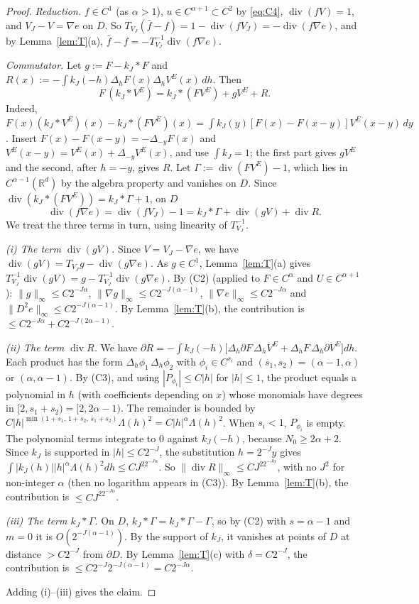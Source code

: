 \documentclass[11pt]{article}
\theoremstyle{definition}
\theoremstyle{remark}
\newcommand{\R}{\mathbb R}
\newcommand{\dv}{\operatorname{div}}
\begin{document}
\begin{proof}
\emph{Reduction.} $f\in C^1$ (as $\alpha>1$), $u\in C^{\alpha+1}\subset C^2$ by \eqref{eq:C4}, $\dv(fV)=1$, and $V_J-V=\nabla e$ on $D$. So
$T_{V_J}(\bar f-f)=1-\dv(fV_J)=-\dv(f\nabla e)$, and by Lemma~\ref{lem:T}(a), $\bar f-f=-T^{-1}_{V_J}\dv(f\nabla e)$.

\emph{Commutator.} Let $g:=F-k_J*F$ and $R(x):=-\int k_J(-h)\Delta_hF(x)\Delta_hV^E(x)\,dh$. Then
\[
F\,(k_J*V^E)=k_J*(FV^E)+gV^E+R .
\]
Indeed, $F(x)(k_J*V^E)(x)-k_J*(FV^E)(x)=\int k_J(y)[F(x)-F(x-y)]V^E(x-y)\,dy$. Insert $F(x)-F(x-y)=-\Delta_{-y}F(x)$ and $V^E(x-y)=V^E(x)+\Delta_{-y}V^E(x)$, and use $\int k_J=1$; the first part gives $gV^E$ and the second, after $h=-y$, gives $R$. Let $\Gamma:=\dv(FV^E)-1$, which lies in $C^{\alpha-1}(\R^d)$ by the algebra property and vanishes on $D$. Since $\dv(k_J*(FV^E))=k_J*\Gamma+1$, on $D$
\[
\dv(f\nabla e)=\dv(fV_J)-1=k_J*\Gamma+\dv(gV)+\dv R .
\]
We treat the three terms in turn, using linearity of $T^{-1}_{V_J}$.

\emph{(i) The term $\dv(gV)$.} Since $V=V_J-\nabla e$, we have $\dv(gV)=T_{V_J}g-\dv(g\nabla e)$. As $g\in C^1$, Lemma~\ref{lem:T}(a) gives $T^{-1}_{V_J}\dv(gV)=g-T^{-1}_{V_J}\dv(g\nabla e)$. By (C2) (applied to $F\in C^\alpha$ and $U\in C^{\alpha+1}$): $\|g\|_\infty\le C2^{-J\alpha}$, $\|\nabla g\|_\infty\le C2^{-J(\alpha-1)}$, $\|\nabla e\|_\infty\le C2^{-J\alpha}$ and $\|D^2e\|_\infty\le C2^{-J(\alpha-1)}$. By Lemma~\ref{lem:T}(b), the contribution is $\le C2^{-J\alpha}+C2^{-J(2\alpha-1)}$.

\emph{(ii) The term $\dv R$.} We have
$\partial R=-\int k_J(-h)\big[\Delta_h\partial F\,\Delta_hV^E+\Delta_hF\,\Delta_h\partial V^E\big]dh$.
Each product has the form $\Delta_h\phi_1\,\Delta_h\phi_2$ with $\phi_i\in C^{s_i}$ and $(s_1,s_2)=(\alpha-1,\alpha)$ or $(\alpha,\alpha-1)$. By (C3), and using $|P_{\phi_i}|\le C|h|$ for $|h|\le1$, the product equals a polynomial in $h$ (with coefficients depending on $x$) whose monomials have degrees in $[2,s_1+s_2)=[2,2\alpha-1)$. The remainder is bounded by
$C|h|^{\min(1+s_1,\,1+s_2,\,s_1+s_2)}\Lambda(h)^2=C|h|^\alpha\Lambda(h)^2$.
When $s_i<1$, $P_{\phi_i}$ is empty. The polynomial terms integrate to $0$ against $k_J(-h)$, because $N_0\ge2\alpha+2$. Since $k_J$ is supported in $|h|\le C2^{-J}$, the substitution $h=2^{-J}y$ gives
$\int|k_J(h)||h|^\alpha\Lambda(h)^2dh\le CJ^22^{-J\alpha}$.
So $\|\dv R\|_\infty\le CJ^22^{-J\alpha}$, with no $J^2$ for non-integer $\alpha$ (then no logarithm appears in (C3)). By Lemma~\ref{lem:T}(b), the contribution is $\le CJ^22^{-J\alpha}$.

\emph{(iii) The term $k_J*\Gamma$.} On $D$, $k_J*\Gamma=k_J*\Gamma-\Gamma$, so by (C2) with $s=\alpha-1$ and $m=0$ it is $O(2^{-J(\alpha-1)})$. By the support of $k_J$, it vanishes at points of $D$ at distance $>C2^{-J}$ from $\partial D$. By Lemma~\ref{lem:T}(c) with $\delta=C2^{-J}$, the contribution is $\le C2^{-J}2^{-J(\alpha-1)}=C2^{-J\alpha}$.

Adding (i)--(iii) gives the claim.
\end{proof}
\end{document}
